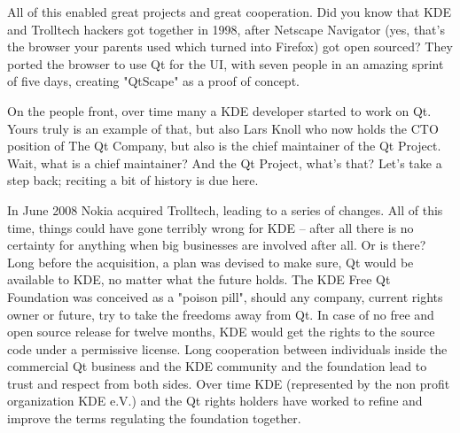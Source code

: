 All of this enabled great projects and great cooperation. Did you know that KDE
and Trolltech hackers got together in 1998, after Netscape Navigator (yes,
that’s the browser your parents used which turned into Firefox) got open
sourced? They ported the browser to use Qt for the UI, with seven people in an
amazing sprint of five days, creating "QtScape" as a proof of concept.

On the people front, over time many a KDE developer started to work on Qt. Yours
truly is an example of that, but also Lars Knoll who now holds the CTO position
of The Qt Company, but also is the chief maintainer of the Qt Project. Wait,
what is a chief maintainer? And the Qt Project, what’s that? Let’s take a
step back; reciting a bit of history is due here.

In June 2008 Nokia acquired Trolltech, leading to a series of changes. All of
this time, things could have gone terribly wrong for KDE – after all there is no
certainty for anything when big businesses are involved after all. Or is there?
Long before the acquisition, a plan was devised to make sure, Qt would be
available to KDE, no matter what the future holds. The KDE Free Qt Foundation
was conceived as a "poison pill", should any company, current rights owner or
future, try to take the freedoms away from Qt. In case of no free and open
source release for twelve months, KDE would get the rights to the source code
under a permissive license. Long cooperation between individuals inside the
commercial Qt business and the KDE community and the foundation lead to trust
and respect from both sides. Over time KDE (represented by the non profit
        organization KDE e.V.) and the Qt rights holders have worked to refine
and improve the terms regulating the foundation together.

